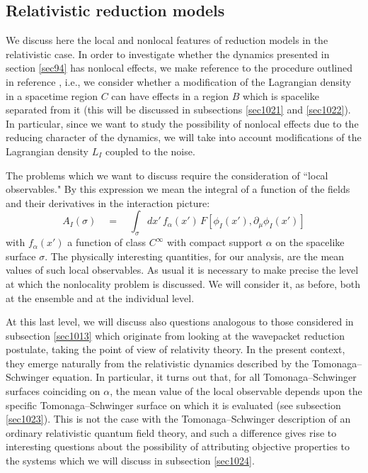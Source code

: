 \documentclass[10pt,a4paper]{article}
\begin{document}
\subsection{Relativistic reduction models} \label{sec102}

We discuss here the local and nonlocal features of reduction
models in the relativistic case. In order to investigate whether
the dynamics presented in section \ref{sec94} has nonlocal
effects, we make reference to the procedure outlined in reference
\cite{hrf}, i.e., we consider whether a modification of the
Lagrangian density in a spacetime region $C$ can have effects in a
region $B$ which is spacelike separated from it (this will be
discussed in subsections \ref{sec1021} and \ref{sec1022}). In
particular, since we want to study the possibility of nonlocal
effects due to the reducing character of the dynamics, we will
take into account modifications of the Lagrangian density $L_{I}$
coupled to the noise.

The problems which we want to discuss require the consideration of
``local observables." By this expression we mean the integral of a
function of the fields and their derivatives in the interaction
picture:
\begin{equation}
A_{I}(\sigma) \quad = \quad \int_{\sigma} dx'\, f_{\alpha}(x')\,
F[\phi_{I}(x'), \partial_{\mu}\phi_{I}(x')]
\end{equation}
with $f_{\alpha}(x')$ a function of class $C^{\infty}$ with
compact support $\alpha$ on the spacelike surface $\sigma$. The
physically interesting quantities, for our analysis, are the mean
values of such local observables. As usual it is necessary to make
precise the level at which the nonlocality problem is discussed.
We will consider it, as before, both at the ensemble and at the
individual level.

At this last level, we will discuss also questions analogous to
those considered in subsection \ref{sec1013} which originate from
looking at the wavepacket reduction postulate, taking the point of
view of relativity theory. In the present context, they emerge
naturally from the relativistic dynamics described by the
Tomonaga--Schwinger equation. In particular, it turns out that,
for all Tomonaga--Schwinger surfaces coinciding on $\alpha$, the
mean value of the local observable depends upon the specific
Tomonaga--Schwinger surface on which it is evaluated (see
subsection \ref{sec1023}). This is not the case with the
Tomonaga--Schwinger description of an ordinary relativistic
quantum field theory, and such a difference gives rise to
interesting questions about the possibility of attributing objective
properties to the systems  which we will discuss in subsection
\ref{sec1024}.
\end{document}
